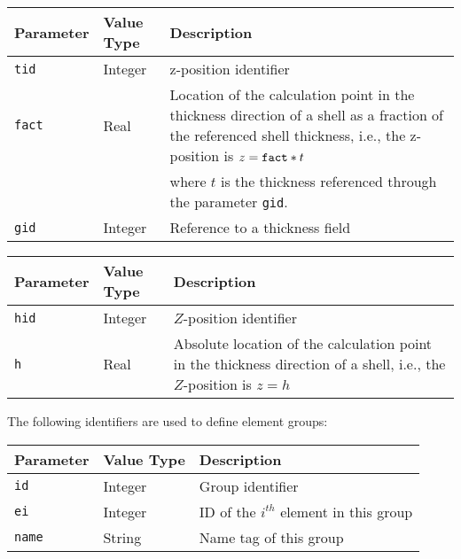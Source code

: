 
\noindent
\begin{tabular}{| m{} | m{} | m{} |}
  \hline
  \rowcolor[HTML]{EFEFEF}
  Parameter  & Value Type & Description \\
  \hline\hline
  {\tt tid}  & Integer & z-position identifier \\
  \hline
  {\tt fact} & Real & Location of the calculation point in the thickness
                      direction of a shell as a fraction of the referenced
                      shell thickness, i.e., the z-position is $z={\tt fact}*t$ \\
             &      & where $t$ is the thickness referenced through the
                      parameter {\tt gid}. \\
  \hline
  {\tt gid}  & Integer & Reference to a thickness field \\
  \hline
\end{tabular}


\noindent
\begin{tabular}{| m{} | m{} | m{} |}
  \hline
  \rowcolor[HTML]{EFEFEF}
  Parameter & Value Type & Description \\
  \hline\hline
  {\tt hid} & Integer & $Z$-position identifier \\
  \hline
  {\tt h} & Real & Absolute location of the calculation point in the
                   thickness direction of a shell, i.e.,
                   the $Z$-position is $z=h$ \\
  \hline
\end{tabular}



The following identifiers are used to define element groups:


\noindent
\begin{tabular}{| m{} | m{} | m{} |}
  \hline
  \rowcolor[HTML]{EFEFEF}
  Parameter & Value Type & Description \\
  \hline\hline
  {\tt id} & Integer & Group identifier \\
  \hline
  {\tt ei} & Integer & ID of the $i^{th}$ element in this group \\
  \hline
  {\tt name} & String & Name tag of this group \\
  \hline
\end{tabular}

